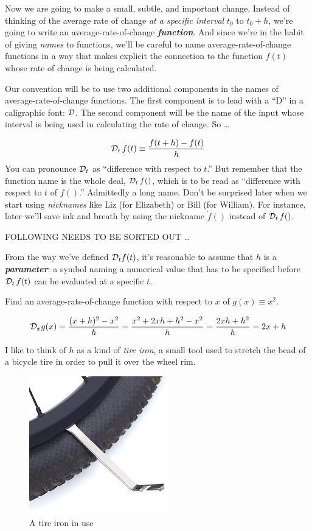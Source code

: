 \documentclass[
]{book}
\begin{document}
Now we are going to make a small, subtle, and important change. Instead of thinking of the average rate of change \emph{at a specific interval} \(t_0\) to \(t_0 + h\), we're going to write an average-rate-of-change \textbf{\emph{function}}. And since we're in the habit of giving \emph{names} to functions, we'll be careful to name average-rate-of-change functions in a way that makes explicit the connection to the function \(f(t)\) whose rate of change is being calculated.

Our convention will be to use two additional components in the names of average-rate-of-change functions. The first component is to lead with a ``D'' in a caligraphic font: \(\cal D\). The second component will be the name of the input whose interval is being used in calculating the rate of change. So \ldots{}

\[{\cal D}_t\, f(t) \equiv \frac{f(t + h) - f(t)}{h}\]
You can pronounce \({\cal D}_t\) as ``difference with respect to \(t\).'' But remember that the function name is the whole deal, \({\cal D}_t\, f()\), which is to be read as ``difference with respect to \(t\) of \(f()\).'' Admittedly a long name. Don't be surprised later when we start using \emph{nicknames} like Liz (for Elizabeth) or Bill (for William). For instance, later we'll save ink and breath by using the nickname \(\dot{f}()\) instead of \({\cal D}_t\, f()\).

FOLLOWING NEEDS TO BE SORTED OUT \ldots{}

From the way we've defined \({\cal D}_t f(t)\), it's reasonable to assume that \(h\) is a \textbf{\emph{parameter}}: a symbol naming a numerical value that has to be specified before \({\cal D}_t\, f(t)\) can be evaluated at a specific \(t\).

Find an average-rate-of-change function with respect to \(x\) of \(g(x) \equiv x^2\).

\[{\cal D}_x g(x) = \frac{(x + h)^2 - x^2}{h}\\
= \frac{x^2 + 2 x h + h^2 - x^2}{h}\\
= \frac{2 x h + h^2}{h} = 2 x + h\]

I like to think of \(h\) as a kind of \emph{tire iron}, a small tool used to stretch the bead of a bicycle tire in order to pull it over the wheel rim.

\begin{figure}

{\centering \includegraphics[width=0.3\linewidth]{www/tire-iron}

}

\caption{A tire iron in use}\label{fig:unnamed-chunk-7}
\end{figure}
\end{document}
